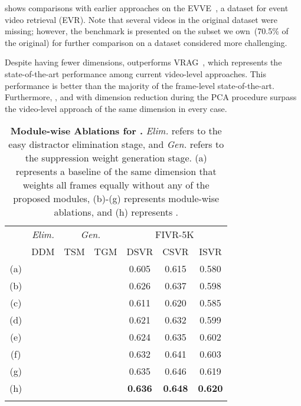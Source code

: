 \documentclass[10pt,twocolumn,letterpaper]{article}
\newcommand{\cmark}{\ding{51}}
\begin{document}
         shows comparisons with earlier approaches on the EVVE~\cite{revaud2013event}, a dataset for event video retrieval (EVR). Note that several videos in the original dataset were missing; however, the benchmark is presented on the subset we own~(70.5\% of the original) for further comparison on a dataset considered more challenging.

    
    
        Despite having fewer dimensions,  outperforms VRAG~\cite{ng2022vrag}, which represents the state-of-the-art performance among current video-level approaches. This performance is better than the majority of the frame-level state-of-the-art. Furthermore, ,  and  with dimension reduction during the PCA procedure surpass the video-level approach of the same dimension in every case.

    \begin{table}[!t] \footnotesize
        \centering
        \begin{tabular}{c|ccc|ccc}
            \cmidrule[\heavyrulewidth]{1-7}
            \morecmidrules
            \cmidrule[\heavyrulewidth]{1-7}
\multicolumn{1}{c}{\multirow{2}{*}[-.3em]{}}
            & \multicolumn{1}{|c|}{\textit{Elim.}}  & \multicolumn{2}{c|}{\textit{Gen.}} & \multicolumn{3}{c}{FIVR-5K} \\ \cmidrule(){2-7} 
           
                &\multicolumn{1}{c|}{DDM} & TSM    & TGM    & DSVR  & CSVR  & ISVR  \\ \midrule 
            (a) &       &        &        & 0.605 &	0.615 &	0.580 \\ \midrule
            (b) &\cmark &        &        & 0.626 &	0.637 &	0.598 \\ \midrule
            (c) &       & \cmark &        & 0.611 &	0.620 &	0.585 \\
            (d) &       &        & \cmark & 0.621 &	0.632 &	0.599 \\
            (e) &       & \cmark & \cmark & 0.624 &	0.635 &	0.602 \\ \midrule 
            (f) &\cmark & \cmark &        & 0.632 &	0.641 &	0.603 \\ 
            (g) &\cmark &        & \cmark & 0.635 &	0.646 &	0.619 \\ \midrule
            (h) &\cmark & \cmark & \cmark & \textbf{0.636} & \textbf{0.648} & \textbf{0.620} \\
            \cmidrule[\heavyrulewidth]{1-7}
            \morecmidrules
            \cmidrule[\heavyrulewidth]{1-7}
        \end{tabular}
        \vspace{-0mm}
        \caption{\textbf{Module-wise Ablations for \textbf{.} }\textit{Elim.} refers to the easy distractor elimination stage, and \textit{Gen.} refers to the suppression weight generation stage. (a) represents a baseline of the same dimension that weights all frames equally without any of the proposed modules, (b)-(g) represents module-wise ablations, and (h) represents . \vspace{3mm}}
        \label{tab:module_ablation500}
    \end{table}
    
\end{document}
